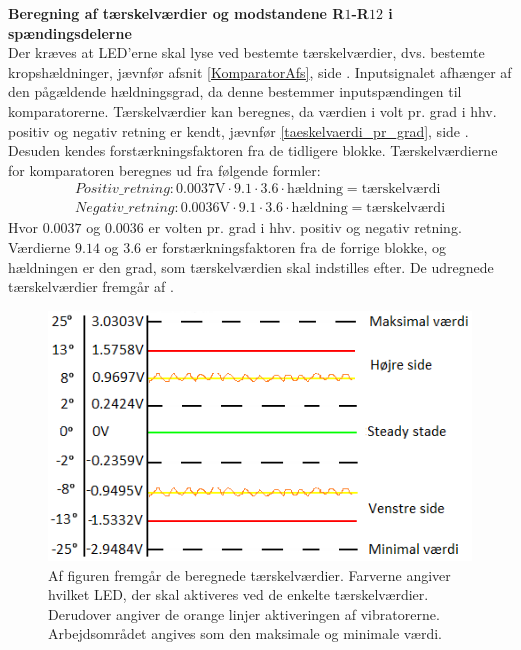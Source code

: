 \noindent\textbf{Beregning af tærskelværdier og modstandene R$1$-R$12$ i spændingsdelerne} \\
Der kræves at LED'erne skal lyse ved bestemte tærskelværdier, dvs. bestemte kropshældninger, jævnfør afsnit \ref{KomparatorAfs}, side \pageref{KomparatorAfs}. Inputsignalet afhænger af den pågældende hældningsgrad, da denne bestemmer inputspændingen til komparatorerne. Tærskelværdier kan beregnes, da værdien i volt pr. grad i hhv. positiv og negativ retning er kendt, jævnfør \eqref{taeskelvaerdi_pr_grad}, side \pageref{Sec_Pilot_Data}. Desuden kendes forstærkningsfaktoren fra de tidligere blokke. Tærskelværdierne for komparatoren beregnes ud fra følgende formler:
\begin{eqnarray} \label{pr_grad} 
Positiv\_retning : 0.0037\text{V} \cdot 9.1 \cdot 3.6 \cdot \text{hældning} = \text{tærskelværdi} \\
Negativ\_retning : 0.0036\text{V} \cdot 9.1 \cdot 3.6 \cdot \text{hældning} = \text{tærskelværdi}
\end{eqnarray}
\noindent Hvor $0.0037$ og $0.0036$ er volten pr. grad i hhv. positiv og negativ retning. Værdierne $9.14$ og $3.6$ er forstærkningsfaktoren fra de forrige blokke, og hældningen er den grad, som tærskelværdien skal indstilles efter. 
De udregnede tærskelværdier fremgår af . 
\begin{figure}[H]
	\centering
	\includegraphics[scale=1.]{figures/cProblemloesning/Taerskelvaerdier.PNG}
	\caption{Af figuren fremgår de beregnede tærskelværdier. Farverne angiver hvilket LED, der skal aktiveres ved de enkelte tærskelværdier. Derudover angiver de orange linjer aktiveringen af vibratorerne. Arbejdsområdet angives som den maksimale og minimale værdi.}
	\label{fig:taerskelvaerdier}
\end{figure}

